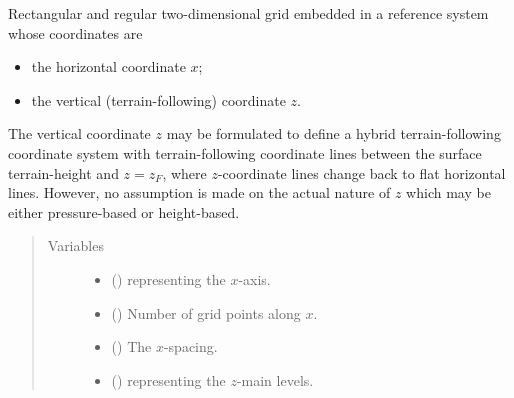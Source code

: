 \documentclass[letterpaper,10pt,english]{sphinxmanual}
\begin{document}
\begin{fulllineitems}
\label{\detokenize{api:tasmania.grids.grid_xz.GridXZ}}
Rectangular and regular two-dimensional grid embedded in a reference system whose coordinates are
\begin{itemize}
\item {} 
the horizontal coordinate \(x\);

\item {} 
the vertical (terrain-following) coordinate \(z\).

\end{itemize}

The vertical coordinate \(z\) may be formulated to define a hybrid terrain-following coordinate system
with terrain-following coordinate lines between the surface terrain-height and \(z = z_F\), where
\(z\)-coordinate lines change back to flat horizontal lines. However, no assumption is made on the actual
nature of \(z\) which may be either pressure-based or height-based.
\begin{quote}\begin{description}
\item[{Variables}] \leavevmode\begin{itemize}
\item {} 
{\hyperref[\detokenize{api:tasmania.grids.grid_xyz.GridXYZ.x}]{}} () \textendash{} {\hyperref[\detokenize{api:tasmania.grids.axis.Axis}]{}} representing the \(x\)-axis.

\item {} 
{\hyperref[\detokenize{api:tasmania.grids.grid_xyz.GridXYZ.nx}]{}} () \textendash{} Number of grid points along \(x\).

\item {} 
{\hyperref[\detokenize{api:tasmania.grids.grid_xyz.GridXYZ.dx}]{}} () \textendash{} The \(x\)-spacing.

\item {} 
 () \textendash{} {\hyperref[\detokenize{api:tasmania.grids.axis.Axis}]{}} representing the \(z\)-main levels.


\end{itemize}
\end{description}
\end{quote}
\end{fulllineitems}
\end{document}
